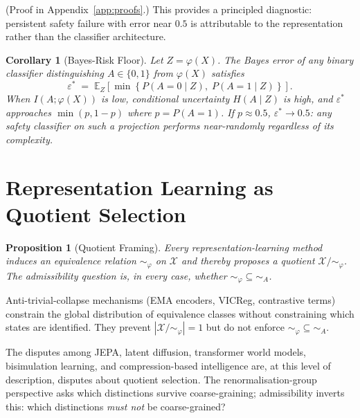 \documentclass[10pt,twocolumn]{article}
\theoremstyle{plain}
\newtheorem{proposition}{Proposition}
\newtheorem{corollary}{Corollary}
\theoremstyle{definition}
\theoremstyle{remark}
\newcommand{\simA}{\sim_{\!A}}
\newcommand{\calX}{\mathcal{X}}
\newcommand{\Xmod}[1]{\calX/{\sim_{#1}}}
\begin{document}
\noindent(Proof in Appendix~\ref{app:proofs}.) This provides a principled
diagnostic: persistent safety failure with error near $0.5$ is attributable to
the representation rather than the classifier architecture.

\begin{corollary}[Bayes-Risk Floor]
\label{cor:bayes}
Let $Z=\varphi(X)$. The Bayes error of any binary classifier distinguishing
$A\in\{0,1\}$ from $\varphi(X)$ satisfies
\begin{equation}
  \varepsilon^* \;=\; \mathbb{E}_{Z}\!\left[\min\!\left\{
    P(A=0\mid Z),\; P(A=1\mid Z)
  \right\}\right].
\end{equation}
When $I(A;\varphi(X))$ is low, conditional uncertainty $H(A\mid Z)$ is high,
and $\varepsilon^*$ approaches $\min(p,1-p)$ where $p=P(A=1)$. If $p\approx 0.5$,
$\varepsilon^*\to 0.5$: any safety classifier on such a projection performs
near-randomly regardless of its complexity.
\end{corollary}

\section{Representation Learning as Quotient Selection}
\label{sec:quotient}

\begin{proposition}[Quotient Framing]
\label{prop:quotient}
Every representation-learning method induces an equivalence relation
${\sim_\varphi}$ on $\calX$ and thereby proposes a quotient $\Xmod{\varphi}$.
The admissibility question is, in every case, whether ${\sim_\varphi}\subseteq\simA$.
\end{proposition}

Anti-trivial-collapse mechanisms (EMA encoders, VICReg, contrastive terms)
constrain the global distribution of equivalence classes without constraining
which states are identified. They prevent $|\Xmod{\varphi}|=1$ but do not enforce
${\sim_\varphi}\subseteq\simA$.

The disputes among JEPA, latent diffusion, transformer world models, bisimulation
learning, and compression-based intelligence are, at this level of description,
disputes about quotient selection. The renormalisation-group perspective
\citep{wilson1975renormalization} asks which distinctions survive coarse-graining;
admissibility inverts this: which distinctions \emph{must not} be coarse-grained?
\end{document}
